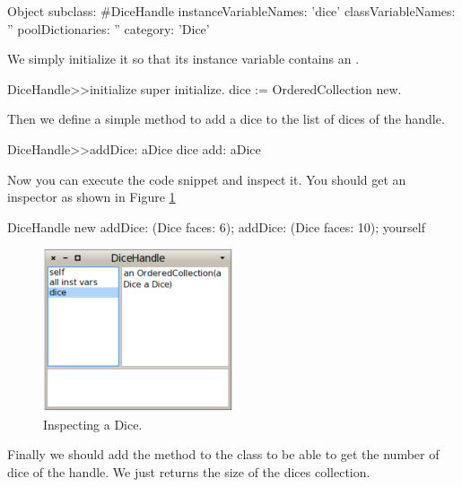 \documentclass[a4paper,10pt,twoside]{book}
\begin{document}
\begin{code}{}
Object subclass: #DiceHandle
	instanceVariableNames: 'dice'
	classVariableNames: ''
	poolDictionaries: ''
	category: 'Dice'
\end{code}


We simply initialize it so that its instance variable  contains an .


\begin{code}{}
DiceHandle>>initialize
	super initialize.
	dice := OrderedCollection new.
\end{code}


Then we define a simple method to add a dice to the list of dices of the handle.


\begin{code}{}
DiceHandle>>addDice: aDice 
	dice add: aDice
\end{code}


Now you can execute the code snippet and inspect it. You should get an inspector as shown in Figure \ref{diceHandleNoDetail} 

\begin{code}{}
DiceHandle new 
	addDice: (Dice faces: 6);
	addDice: (Dice faces: 10);
	yourself
\end{code}



\begin{figure}

\begin{center}
\includegraphics[width=0.5\textwidth]{figures/DiceHandleNoDetail.pdf}\caption{Inspecting a Dice.\label{diceHandleNoDetail}}\end{center}
\end{figure}


Finally we should add the method  to the  class to be able to get the number of dice of the handle. We just returns the size of the dices collection.
\end{document}

